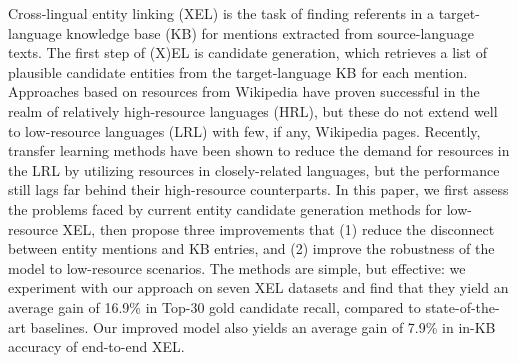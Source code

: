 Cross-lingual entity linking (XEL) is the task of finding referents in a target-language knowledge base (KB) for mentions extracted from source-language texts. The first step of (X)EL is candidate generation, which retrieves a list of plausible candidate entities from the target-language KB for each mention. Approaches based on resources from Wikipedia have proven successful in the realm of relatively high-resource languages (HRL), but these do not extend well to low-resource languages (LRL) with few, if any, Wikipedia pages. Recently, transfer learning methods have been shown to reduce the demand for resources in the LRL by utilizing resources in closely-related languages, but the performance still lags far behind their high-resource counterparts. In this paper, we first assess the problems faced by current entity candidate generation methods for low-resource XEL, then propose three improvements that (1) reduce the disconnect between entity mentions and KB entries, and (2) improve the robustness of the model to low-resource scenarios. The methods are simple, but effective: we experiment with our approach on seven XEL datasets and find that they yield an average gain of 16.9\% in Top-30 gold candidate recall, compared to state-of-the-art baselines. Our improved model also yields an average gain of 7.9\% in in-KB accuracy of end-to-end XEL.